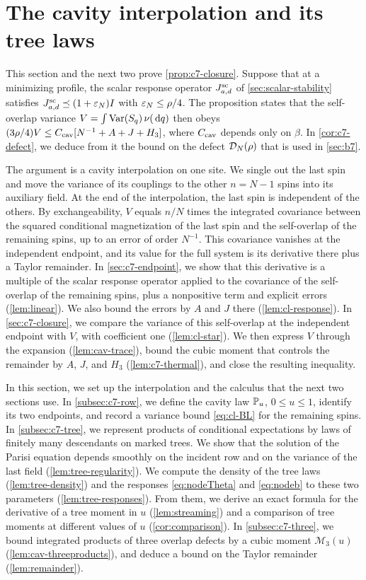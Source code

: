 \chapter{The cavity interpolation and its tree laws}\label{sec:c7}

This section and the next two prove \cref{prop:c7-closure}. Suppose that
at a minimizing profile, the scalar response operator $J^{\mathrm{sc}}_{a,d}$
of \cref{sec:scalar-stability} satisfies
$J^{\mathrm{sc}}_{a,d}\preceq(1+\varepsilon_N)I$ with $\varepsilon_N\le\rho/4$. The
proposition states that the self-overlap variance
$V=\int\operatorname{Var}(S_q)\,\nu(\,\mathrm d q)$ then obeys
$(3\rho/4)V\le C_{\rm cav}[N^{-1}+A+J+H_3]$, where $C_{\rm cav}$ depends
only on $\beta$. In \cref{cor:c7-defect}, we deduce from it the bound on
the defect $\mathcal D_N(\rho)$ that is used in \cref{sec:b7}.

The argument is a cavity interpolation on one site. We single out the
last spin and move the variance of its couplings to the other $n=N-1$
spins into its auxiliary field. At the end of the interpolation, the last
spin is independent of the others. By exchangeability, $V$ equals $n/N$
times the integrated covariance between the squared conditional
magnetization of the last spin and the self-overlap of the remaining
spins, up to an error of order $N^{-1}$. This covariance vanishes at the
independent endpoint, and its value for the full system is its derivative
there plus a Taylor remainder. In
\cref{sec:c7-endpoint}, we show that this derivative is a multiple of the
scalar response operator applied to the covariance of the self-overlap of
the remaining spins, plus a nonpositive term and explicit errors
(\cref{lem:linear}). We also bound the errors by $A$ and $J$ there
(\cref{lem:cl-response}). In \cref{sec:c7-closure}, we compare the
variance of this self-overlap at the independent endpoint with $V$, with
coefficient one (\cref{lem:cl-star}). We then express $V$ through the
expansion (\cref{lem:cav-trace}), bound the cubic moment that controls
the remainder by $A$, $J$, and $H_3$ (\cref{lem:c7-thermal}), and close the
resulting inequality.

In this section, we set up the interpolation and the calculus that the
next two sections use. In \cref{subsec:c7-row}, we define the cavity law
$\mathbb P_u$, $0\le u\le1$, identify its two endpoints, and record a variance
bound \eqref{eq:cl-BL} for the remaining spins. In \cref{subsec:c7-tree},
we represent products of conditional expectations by laws of finitely
many descendants on marked trees. We show that the solution of the Parisi
equation depends smoothly on the incident row and on the variance of the
last field (\cref{lem:tree-regularity}). We compute the density of the
tree laws (\cref{lem:tree-density}) and the responses
\eqref{eq:nodeTheta} and \eqref{eq:nodeb} to these two parameters
(\cref{lem:tree-responses}). From them, we derive an exact formula for the
derivative of a tree moment in $u$ (\cref{lem:streaming}) and a
comparison of tree moments at different values of $u$
(\cref{cor:comparison}). In \cref{subsec:c7-three}, we bound integrated
products of three overlap defects by a cubic moment $\mathcal M_3(u)$
(\cref{lem:cav-threeproducts}), and deduce a bound on the Taylor
remainder (\cref{lem:remainder}).


